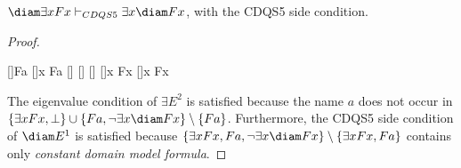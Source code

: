 \begin{claim}
$\diam \exists x Fx \vdash_{CDQS5} \exists x \diam Fx$, with the CDQS5 side condition.
\end{claim}

\begin{proof}
\begin{prooftree*}
[\diami]{\diam Fa}
[\exi]{\exists x \diam Fa}
[\nege]{\bot}
[]{\bot}
[]{\bot}
[]{\neg \neg \exists x \diam Fx}
[\dne]{\exists x \diam Fx}
\end{prooftree*}
The eigenvalue condition of $\exists E^2$ is satisfied because the name $a$ does not occur in \\ $\{ \exists x Fx, \bot \} \cup \{ Fa, \neg \exists x \diam Fx \} \setminus \{ Fa \}$.
Furthermore, the CDQS5 side condition of $\diam E^1$ is satisfied because $\{ \exists x Fx, Fa, \neg \exists x \diam Fx \} \setminus \{ \exists x Fx, Fa \}$ contains only \textit{constant domain model formula}.
\end{proof}
